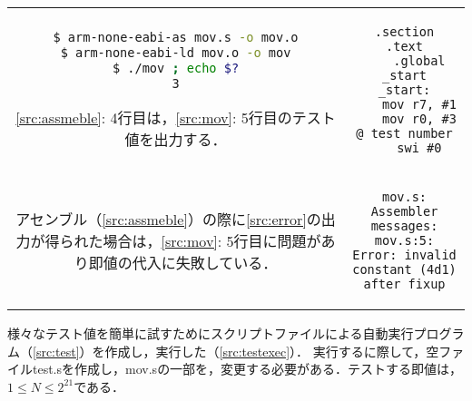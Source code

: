 \begin{tabular}[c]{cc}
    \begin{minipage}[t]{0.45\textwidth}
        \centering
        \begin{lstlisting}[caption={アセンブル},label={src:assmeble},language={Bash},frame={left}]
$ arm-none-eabi-as mov.s -o mov.o
$ arm-none-eabi-ld mov.o -o mov
$ ./mov ; echo $?
3
    \end{lstlisting}
        \begin{flushleft}
            \ref{src:assmeble}: 4行目は，\ref{src:mov}: 5行目のテスト値を出力する．
        \end{flushleft}
    \end{minipage} &
    \begin{minipage}[t]{0.45\textwidth}
        \centering
        \begin{lstlisting}[caption={{\ttfamily mov.s}},label={src:mov},frame={left}]
    .section    .text
    .global     _start
_start:
    mov r7, #1
    mov r0, #3 @ test number
    swi #0
\end{lstlisting}
    \end{minipage}
    \vspace{0.5em}                                                                          \\
    \begin{minipage}[c]{0.45\textwidth}
        アセンブル（\ref{src:assmeble}）の際に\ref{src:error}の出力が得られた場合は，\ref{src:mov}: 5行目に問題があり即値の代入に失敗している．
    \end{minipage}
    \hspace{1em}                                                                          &
    \begin{minipage}[c]{0.45\textwidth}
        \begin{lstlisting}[numbers={none},caption={Error出力},label={src:error},frame={single}]
mov.s: Assembler messages:
mov.s:5: Error: invalid constant (4d1) after fixup
    \end{lstlisting}
    \end{minipage}
\end{tabular}
様々なテスト値を簡単に試すためにスクリプトファイルによる自動実行プログラム（\ref{src:test}）を作成し，実行した（\ref{src:testexec}）．
実行するに際して，空ファイル{\ttfamily test.s}を作成し，{\ttfamily mov.s}の一部を，変更する必要がある．テストする即値は，\(1\leq N\leq 2^{21}\)である．
